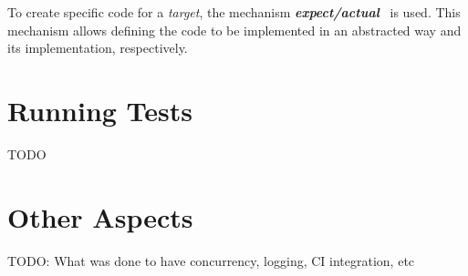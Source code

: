 To create specific code for a \textit{target}, the mechanism \textbf{\textit{expect/actual}}~\cite{kmp-expect-actual} is used.
This mechanism allows defining the code to be implemented in an abstracted way and its implementation, respectively.


\section{Running Tests}\label{sec:running-tests}
TODO


\section{Other Aspects}\label{sec:other-aspects}
TODO: What was done to have concurrency, logging, CI integration, etc
